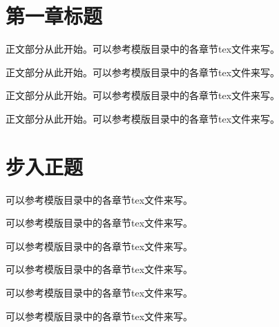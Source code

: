 \documentclass{swfcthesis}
\begin{document}

\makepreliminarypages
\frontmatter
\tableofcontents
\listoffigures
\listoftables
\mainmatter

\chapter{第一章标题}
\label{cha:one}

正文部分从此开始。可以参考模版目录中的各章节tex文件来写。

正文部分从此开始。可以参考模版目录中的各章节tex文件来写。

正文部分从此开始。可以参考模版目录中的各章节tex文件来写。

正文部分从此开始。可以参考模版目录中的各章节tex文件来写。

\chapter{步入正题}
\label{cha:two}

可以参考模版目录中的各章节tex文件来写。

可以参考模版目录中的各章节tex文件来写。

可以参考模版目录中的各章节tex文件来写。

可以参考模版目录中的各章节tex文件来写。

可以参考模版目录中的各章节tex文件来写。

可以参考模版目录中的各章节tex文件来写。
\end{document}
